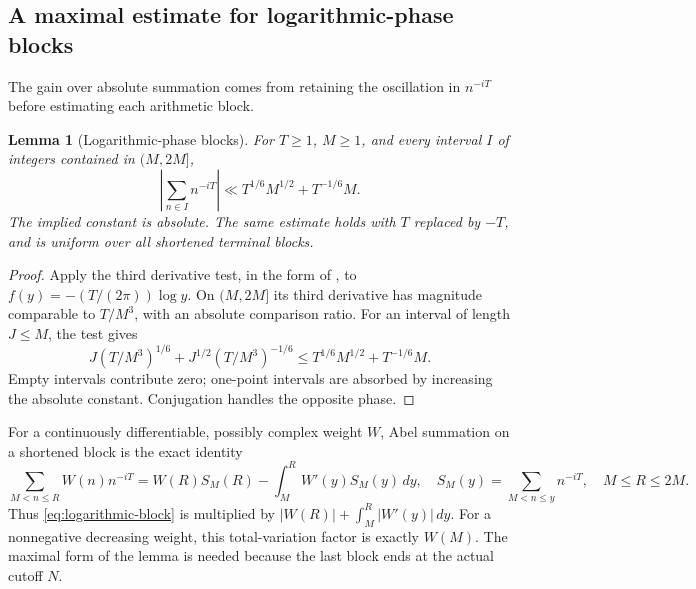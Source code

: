 \documentclass[11pt]{article}
\numberwithin{equation}{section}
\newtheorem{lemma}[theorem]{Lemma}
\theoremstyle{definition}
\theoremstyle{remark}
\newcommand{\dd}{\,d}
\begin{document}
\subsection{A maximal estimate for logarithmic-phase blocks}
The gain over absolute summation comes from retaining the oscillation in
$n^{-iT}$ before estimating each arithmetic block.
\begin{lemma}[Logarithmic-phase blocks]\label{lem:logarithmic-block}
For $T\ge1$, $M\ge1$, and every interval $I$ of integers contained in
$(M,2M]$,
\begin{equation}
 \left|\sum_{n\in I}n^{-iT}\right|
 \ll T^{1/6}M^{1/2}+T^{-1/6}M.
 \label{eq:logarithmic-block}
\end{equation}
The implied constant is absolute. The same estimate holds with $T$
replaced by $-T$, and is uniform over all shortened terminal blocks.
\end{lemma}
\begin{proof}
Apply the third derivative test, in the form of
\cite[Theorem 2 and its preceding proof]{robert}, to
$f(y)=-(T/(2\pi))\log y$. On $(M,2M]$ its third derivative has
magnitude comparable to $T/M^3$, with an absolute comparison ratio.
For an interval of length $J\le M$, the test gives
\[
 J(T/M^3)^{1/6}+J^{1/2}(T/M^3)^{-1/6}
 \le T^{1/6}M^{1/2}+T^{-1/6}M.
\]
Empty intervals contribute zero; one-point intervals are absorbed by
increasing the absolute constant. Conjugation handles the opposite phase.
\end{proof}

For a continuously differentiable, possibly complex weight $W$, Abel
summation on a shortened block is the exact identity
\begin{equation}
 \sum_{M<n\le R}W(n)n^{-iT}
 =W(R)S_M(R)-\int_M^R W'(y)S_M(y)\dd y,
 \quad S_M(y)=\sum_{M<n\le y}n^{-iT},
 \quad M\le R\le2M.
 \label{eq:abel-logarithmic-block}
\end{equation}
Thus \eqref{eq:logarithmic-block} is multiplied by
$|W(R)|+\int_M^R|W'(y)|\dd y$. For a nonnegative decreasing weight,
this total-variation factor is exactly $W(M)$. The maximal form of the
lemma is needed because the last block ends at the actual cutoff $N$.
\end{document}
